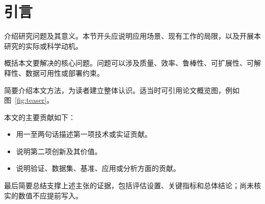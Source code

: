 \section{引言}

介绍研究问题及其意义。本节开头应说明应用场景、现有工作的局限，以及开展本研究的实际或科学动机。

概括本文要解决的核心问题。问题可以涉及质量、效率、鲁棒性、可扩展性、可解释性、数据可用性或部署约束。

简要介绍本文方法，为读者建立整体认识。适当时可引用论文概览图，例如图~\ref{fig:teaser}。

本文的主要贡献如下：
\begin{itemize}
  \item {} 用一至两句话描述第一项技术或实证贡献。
  \item {} 说明第二项创新及其价值。
  \item {} 说明验证、数据集、基准、应用或分析方面的贡献。
\end{itemize}

最后简要总结支撑上述主张的证据，包括评估设置、关键指标和总体结论；尚未核实的数值不应提前写入。

\newpage

